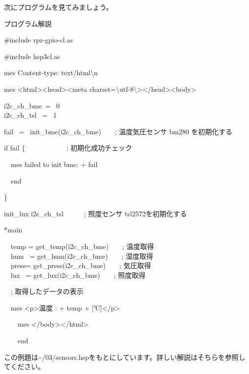 \documentclass[a4paper,12pt,dvipdfmx]{jarticle}
\begin{document}
次にプログラムを見てみましょう。


\clearpage
プログラム解説



\centering
\begin{boxedminipage}{16.81cm}
	\#include {\textquotedbl}rpz-gpio-cl.as{\textquotedbl}

	\#include {\textquotedbl}hsp3cl.as{\textquotedbl}


	\bigskip

	mes {\textquotedbl}Content-type: text/html{\textbackslash}n{\textquotedbl}

	mes {\textquotedbl}{\textless}html{\textgreater}{\textless}head{\textgreater}{\textless}meta
	charset={\textbackslash}{\textquotedbl}utf-8{\textbackslash}{\textquotedbl}{\textgreater}{\textless}/head{\textgreater}{\textless}body{\textgreater}{\textquotedbl}


	\bigskip

	i2c\_ch\_bme\ = \ 0\\
	i2c\_ch\_tsl \ = \ 1

	\bigskip

	fail \ = \ init\_bme(i2c\_ch\_bme)\ \ \ \ ; 温度気圧センサ bm280
	を初期化する

	if fail \{\ \ \ \ \ \ \ \ \ \ \ \   ; 初期化成功チェック

	\ \ mes {\textquotedbl}failed to init bme: {\textquotedbl} + fail

	\ \ end

	\}


	\bigskip

	init\_lux i2c\_ch\_tsl\ \ \ \ \ \ ; 照度センサ
	tsl2572を初期化する


	\bigskip

	*main


	\bigskip

	\ \ temp = get\_temp(i2c\_ch\_bme)\ \ \ \ ; 温度取得\\
	\ \ hum \ = get\_hum(i2c\_ch\_bme)\ \ \ \ ; 湿度取得\\
	\ \ press= get\_press(i2c\_ch\_bme)\ \ \ \ ; 気圧取得\\
	\ \ lux \ = get\_lux(i2c\_ch\_bme)\ \ \ \ ; 照度取得\\


	\bigskip


	\bigskip

	\ \ ; 取得したデータの表示

	\ \ mes {\textquotedbl}{\textless}p{\textgreater}温度 : {\textquotedbl} + temp + {\textquotedbl}
	[℃]{\textless}/p{\textgreater}{\textquotedbl}


	\bigskip

	\ \ \ \ mes {\textquotedbl}{\textless}/body{\textgreater}{\textless}/html{\textgreater}{\textquotedbl}

	\ \ \ \ end
\end{boxedminipage}
\flushleft
この例題は{\textasciitilde}/03/sensors.hspをもとにしています。詳しい解説はそちらを参照してください。
\end{document}
